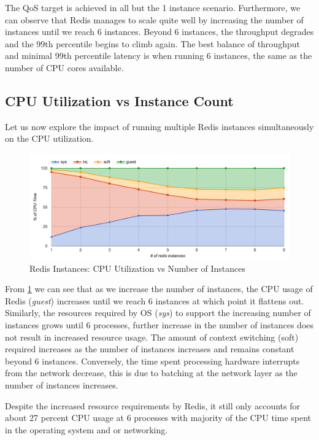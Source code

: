 The QoS target is achieved in all but the 1 instance scenario. Furthermore, we can observe that Redis manages to scale quite well by increasing the number of instances until we reach 6 instances. Beyond 6 instances, the throughput degrades and the 99th percentile begins to climb again. The best balance of throughput and minimal 99th percentile latency is when running 6 instances, the same as the number of CPU cores available.

\subsection{CPU Utilization vs Instance Count}
Let us now explore the impact of running multiple Redis instances simultaneously on the CPU utilization.

\begin{figure}[h]
    \includegraphics[width=\textwidth]{./res/6_instances_cpu.png}
    \caption{Redis Instances: CPU Utilization vs Number of Instances}
    \label{fig:6_instances_cpu.png}
\end{figure}

From \ref{fig:6_instances_cpu.png} we can see that as we increase the number of instances, the CPU usage of Redis (\textit{guest}) increases until we reach 6 instances at which point it flattens out. Similarly, the resources required by OS (\textit{sys}) to support the increasing number of instances grows until 6 processes, further increase in the number of instances does not result in increased resource usage. The amount of context switching (soft) required increases as the number of instances increases and remains constant beyond 6 instances. Conversely, the time spent processing hardware interrupts from the network decrease, this is due to batching at the network layer as the number of instances increases.

Despite the increased resource requirements by Redis, it still only accounts for about 27 percent CPU usage at 6 processes with majority of the CPU time spent in the operating system and or networking.


